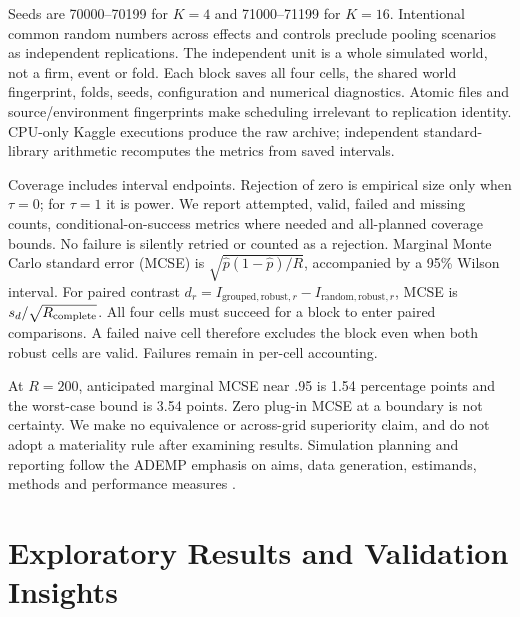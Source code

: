 \documentclass[conference]{IEEEtran}
\begin{document}
Seeds are 70000--70199 for $K=4$ and 71000--71199 for $K=16$. Intentional common random numbers across effects and controls preclude pooling scenarios as independent replications. The independent unit is a whole simulated world, not a firm, event or fold. Each block saves all four cells, the shared world fingerprint, folds, seeds, configuration and numerical diagnostics. Atomic files and source/environment fingerprints make scheduling irrelevant to replication identity. CPU-only Kaggle executions produce the raw archive; independent standard-library arithmetic recomputes the metrics from saved intervals.

Coverage includes interval endpoints. Rejection of zero is empirical size only when $\tau=0$; for $\tau=1$ it is power. We report attempted, valid, failed and missing counts, conditional-on-success metrics where needed and all-planned coverage bounds. No failure is silently retried or counted as a rejection. Marginal Monte Carlo standard error (MCSE) is $\sqrt{\widehat p(1-\widehat p)/R}$, accompanied by a 95\% Wilson interval. For paired contrast $d_r=I_{\mathrm{grouped,robust},r}-I_{\mathrm{random,robust},r}$, MCSE is $s_d/\sqrt{R_{\rm complete}}$. All four cells must succeed for a block to enter paired comparisons. A failed naive cell therefore excludes the block even when both robust cells are valid. Failures remain in per-cell accounting.

At $R=200$, anticipated marginal MCSE near .95 is 1.54 percentage points and the worst-case bound is 3.54 points. Zero plug-in MCSE at a boundary is not certainty. We make no equivalence or across-grid superiority claim, and do not adopt a materiality rule after examining results. Simulation planning and reporting follow the ADEMP emphasis on aims, data generation, estimands, methods and performance measures \cite{ademp}.

\section{Exploratory Results and Validation Insights}
\end{document}

